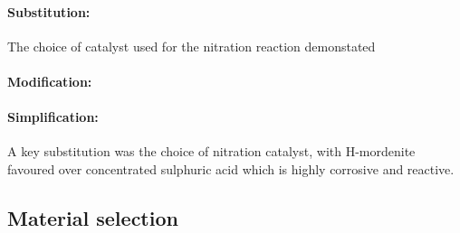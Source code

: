 \paragraph{Substitution:} The choice of catalyst used for the nitration reaction demonstated 



\paragraph{Modification:}


\paragraph{Simplification:} 


     A key substitution was the choice of nitration catalyst, with H-mordenite favoured over concentrated sulphuric acid which is highly corrosive and reactive.  




\subsection{Material selection}